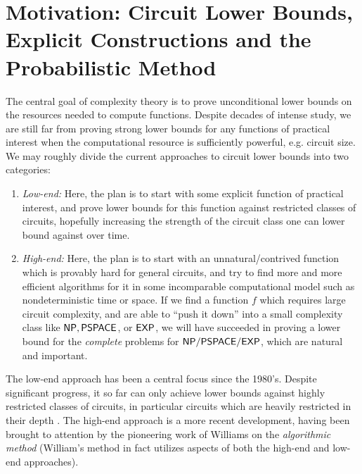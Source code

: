 

\section{Motivation: Circuit Lower Bounds, Explicit Constructions and the Probabilistic Method}

The central goal of complexity theory is to prove unconditional lower bounds on the resources needed to compute functions. Despite decades of intense study, we are still far from proving strong lower bounds for any functions of practical interest when the computational resource is sufficiently powerful, e.g. circuit size.  We may roughly divide the current approaches to circuit lower bounds into two categories:

\begin{enumerate}
    \item \emph{Low-end:} Here, the plan is to start with some explicit function of practical interest, and prove lower bounds for this function against restricted classes of circuits, hopefully increasing the strength of the circuit class one can lower bound against over time.
    \item \emph{High-end:} Here, the plan is to start with an unnatural/contrived function which is provably hard for general circuits, and try to find more and more efficient algorithms for it in some incomparable computational model such as nondeterministic time or space. If we find a function $f$ which requires large circuit complexity, and are able to ``push it down'' into a small complexity class like $\cl{NP, PSPACE}$, or $\cl{EXP}$, we will have succeeded in proving a lower bound for the \emph{complete} problems for  $\cl{NP/PSPACE/ EXP}$, which are natural and important.
\end{enumerate}
The low-end approach has been a central focus since the 1980's. Despite significant progress, it so far can only achieve lower bounds against highly restricted classes of circuits, in particular circuits which are heavily restricted in their depth \cite{Ajtai83,FSS,hastad-switching, razborov-polynoms,smolensky-ac0p,hajnal-threshold}.
The high-end approach is a more recent development, having been brought to attention by the pioneering work of Williams on the \emph{algorithmic method} \cite{williams-sat, ryan-acc} (William's method in fact utilizes aspects of both the high-end and low-end approaches). 

